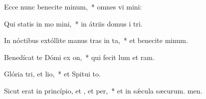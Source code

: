 \item Ecce nunc benecite minum,~* omnes vi mini:
\item Qui statis in mo mini,~* in átriis domus i tri.
\item In nóctibus extóllite manus tras in ta,~* et benecite minum.
\item Benedícat te Dómi ex on,~* qui fecit lum et ram.
\item Glória tri, et lio,~* et Spitui to.
\item Sicut erat in princípio, et , et per,~* et in sǽcula sæcurum. men.
